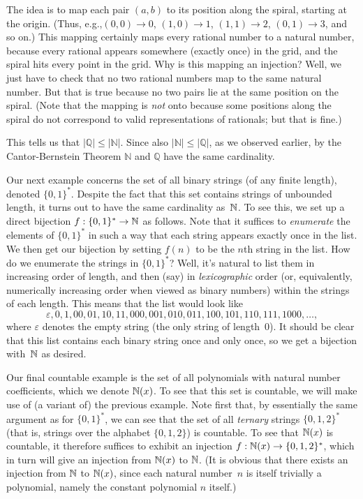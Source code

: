 \documentclass[11pt,fleqn]{article}
\begin{document}
The idea is to map each pair $(a,b)$ to its position along the spiral, starting at
the origin.  (Thus, e.g.,$(0,0)\rightarrow 0$, $(1,0)\rightarrow 1$, $(1,1)\rightarrow 2$,
$(0,1)\rightarrow 3$, and so on.)  This mapping certainly maps every rational
number to a natural number, because every rational appears somewhere (exactly once)
in the grid, and the spiral hits every point in the grid.  Why is this mapping an injection?
Well, we just have to check that no two rational numbers map to the same natural
number.  But that is true because no two pairs lie at the same position on the spiral.
(Note that the mapping is {\it not\/} onto because some positions along the spiral
do not correspond to valid representations of rationals; but that is fine.)

This tells us that $|\mathbb{Q}| \leq |\mathbb{N}|$. Since
also $|\mathbb{N}| \leq |\mathbb{Q}|$, as we observed earlier, by the Cantor-Bernstein
Theorem $\mathbb{N}$ and $\mathbb{Q}$ have the same cardinality.

Our next example concerns the set of all binary strings (of any finite length),
denoted $\{0,1\}^*$.  Despite the fact that this set contains strings of unbounded length,
it turns out to have the same cardinality as~$\mathbb{N}$.  To see this, we set up a direct
bijection $f:\{0,1\}^*\to\mathbb{N}$ as follows.  Note that it suffices to {\it enumerate\/} the elements
of $\{0,1\}^*$ in such a way that each string appears exactly once in the list.  We then
get our bijection by setting $f(n)$ to be the $n$th string in the list.  How do we enumerate
the strings in $\{0,1\}^*$?  Well, it's natural to list them in increasing order of length, and
then (say) in {\it lexicographic\/} order (or, equivalently, numerically increasing order when
viewed as binary numbers) within the strings of each length.  This means that
the list would look like $$
   \varepsilon,0,1,00,01,10,11,000,001,010,011,100,101,110,111,1000,\ldots, $$
where $\varepsilon$ denotes the empty string (the only string of length~0).
It should be clear that this list contains each binary string once and only once, so we
get a bijection with~$\mathbb{N}$ as desired.

Our final countable example is the set of all polynomials with natural number
coefficients, which we denote $\mathbb{N}(x)$.  To see that this set is countable,
we will make use of (a variant of) the previous example.  Note first that, by essentially
the same argument as for $\{0,1\}^*$, we can see that the set of all {\it ternary\/}
strings $\{0,1,2\}^*$ (that is, strings over the alphabet $\{0,1,2\}$) is countable.
To see that $\mathbb{N}(x)$ is countable, it therefore suffices  to exhibit an injection
$f:\mathbb{N}(x)\to\{0,1,2\}^*$, which in turn will give an injection from $\mathbb{N}(x)$ to $\mathbb{N}$.
(It is obvious that there exists an injection from $\mathbb{N}$ to $\mathbb{N}(x)$,
since each natural number~$n$ is itself trivially a polynomial, namely the constant
polynomial $n$ itself.)
\end{document}
